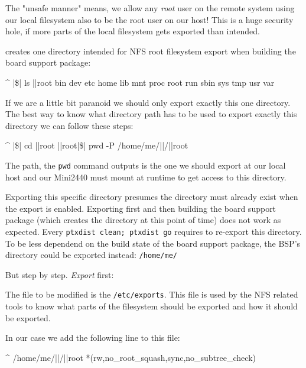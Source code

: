 The "unsafe manner" means, we allow any \textit{root} user on the remote system
using our local filesystem also to be the root user on our host! This is a huge
security hole, if more parts of the local filesystem gets exported than intended.

\ptxdist{} creates one directory intended for NFS root filesystem export when building
the board support package:

\begin{ptxshell}[escapechar=|]{^}
|\$|  ls |\ptxdistPlatformDir |root
bin  dev  etc  home  lib  mnt  proc  root  run  sbin  sys  tmp  usr  var
\end{ptxshell}

If we are a little bit paranoid we should only export exactly this one directory. The
best way to know what directory path has to be used to export exactly this directory
we can follow these steps:

\begin{ptxshell}[escapechar=|]{^}
|\$| cd |\ptxdistPlatformDir |root
|\ptxdistPlatformDir |root|\$| pwd -P
/home/me/|\ptxdistBSPName |/|\ptxdistPlatformDir |root
\end{ptxshell}

The path, the \texttt{pwd} command outputs is the one we should export at our local
host and our Mini2440 must mount at runtime to get access to this directory.

\begin{important}
Exporting this specific directory presumes the directory must already exist when the export
is enabled. Exporting first and then building the board support package (which creates the
directory at this point of time) does not work as expected. Every \texttt{ptxdist clean; ptxdist go}
requires to re-export this directory.\\
To be less dependend on the build state of the board support package, the BSP's directory
could be exported instead: \texttt{/home/me/\ptxdistBSPName }
\end{important}

But step by step. \textit{Export} first:

The file to be modified is the \texttt{/etc/exports}. This file is used by the NFS related
tools to know what parts of the filesystem should be exported and how it should be exported.

In our case we add the following line to this file:

\begin{ptxshell}[escapechar=|]{^}
/home/me/|\ptxdistBSPName |/|\ptxdistPlatformDir |root *(rw,no_root_squash,sync,no_subtree_check)
\end{ptxshell}

